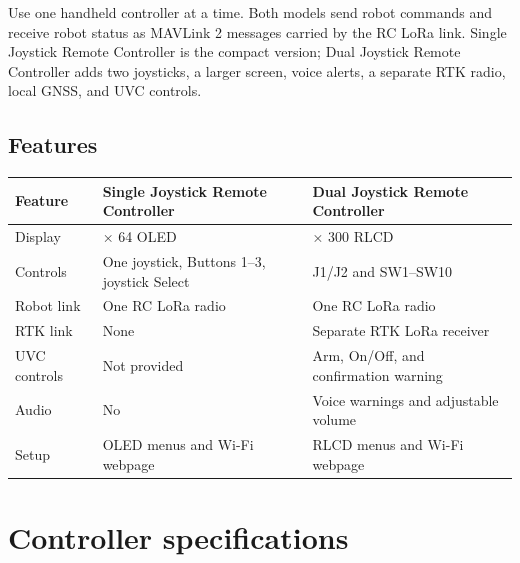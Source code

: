 \documentclass[
  10pt,
  letterpaper,
  openany]{report}
\newcounter{none} %
\begin{document}
Use one handheld controller at a time. Both models send robot commands
and receive robot status as MAVLink 2 messages carried by the RC LoRa
link. Single Joystick Remote Controller is the compact version; Dual
Joystick Remote Controller adds two joysticks, a larger screen, voice
alerts, a separate RTK radio, local GNSS, and UVC controls.

\subsection{Features}\label{features}

{\def\LTcaptype{none} %
\begin{longtable}[]{@{}
  >{\raggedright\arraybackslash}p{}
  >{\raggedright\arraybackslash}p{}
  >{\raggedright\arraybackslash}p{}@{}}
\toprule\noalign{}
\begin{minipage}[b]{\linewidth}\raggedright
Feature
\end{minipage} & \begin{minipage}[b]{\linewidth}\raggedright
Single Joystick Remote Controller
\end{minipage} & \begin{minipage}[b]{\linewidth}\raggedright
Dual Joystick Remote Controller
\end{minipage} \\
\midrule\noalign{}
\endhead
\bottomrule\noalign{}
\endlastfoot
Display & 128 × 64 OLED & 400 × 300 RLCD \\
Controls & One joystick, Buttons 1--3, joystick Select & J1/J2 and
SW1--SW10 \\
Robot link & One RC LoRa radio & One RC LoRa radio \\
RTK link & None & Separate RTK LoRa receiver \\
UVC controls & Not provided & Arm, On/Off, and confirmation warning \\
Audio & No & Voice warnings and adjustable volume \\
Setup & OLED menus and Wi-Fi webpage & RLCD menus and Wi-Fi webpage \\
\end{longtable}
}

\protect{}\label{controller-specs}
\section{Controller specifications}\label{controller-specifications}
\end{document}
